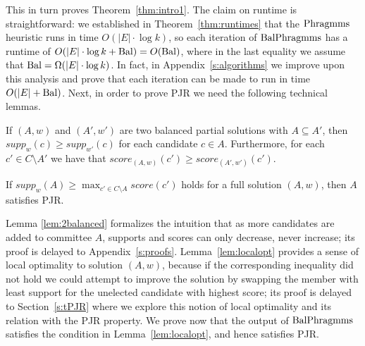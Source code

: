 This in turn proves Theorem~\ref{thm:intro1}. 
The claim on runtime is straightforward: we established in Theorem~\ref{thm:runtimes} that the $\operatorname{Phragmms}$ heuristic runs in time $O(|E|\cdot \log k)$, so each iteration of $\operatorname{BalPhragmms}$ has a runtime of $O(|E|\cdot \log k + \operatorname{Bal})=O(\operatorname{Bal})$, where in the last equality we assume that $\operatorname{Bal}= \Omega(|E|\cdot \log k)$. 
In fact, in Appendix~\ref{s:algorithms} we improve upon this analysis and prove that each iteration can be made to run in time $O(|E| + \operatorname{Bal})$.
Next, in order to prove PJR we need the following technical lemmas.

\begin{lemma}\label{lem:2balanced}
If $(A,w)$ and $(A',w')$ are two balanced partial solutions with $A\subseteq A'$, then $supp_w(c)\geq supp_{w'}(c)$ for each candidate $c\in A$. 
Furthermore, for each $c'\in C\setminus A'$ we have that $score_{(A,w)}(c')\geq score_{(A',w')}(c')$.
\end{lemma}

\begin{lemma}\label{lem:localopt}
If $supp_w(A)\geq \max_{c'\in C\setminus A} score(c')$ holds for a full solution $(A,w)$, then $A$ satisfies PJR.
\end{lemma}

Lemma \ref{lem:2balanced} formalizes the intuition that as more candidates are added to committee $A$, supports and scores can only decrease, never increase; its proof is delayed to Appendix~\ref{s:proofs}.
Lemma~\ref{lem:localopt} provides a sense of local optimality to solution $(A,w)$, because if the corresponding inequality did not hold we could attempt to improve the solution by swapping the member with least support for the unelected candidate with highest score; its proof is delayed to Section~\ref{s:tPJR} where we explore this notion of local optimality and its relation with the PJR property. 
We prove now that the output of $\operatorname{BalPhragmms}$ satisfies the condition in Lemma~\ref{lem:localopt}, and hence satisfies PJR.

